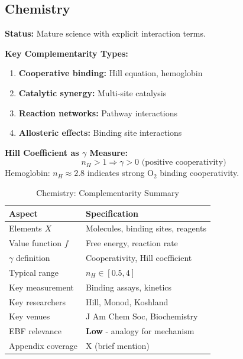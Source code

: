 \subsection{Chemistry}
\label{sec:chem}

\begin{tcolorbox}[colback=yellow!5!white,colframe=yellow!75!black,title=\textbf{Chemistry: Molecular Interactions and Catalysis}]

\textbf{Status:} Mature science with explicit interaction terms.

\textbf{Key Complementarity Types:}
\begin{enumerate}[noitemsep]
    \item \textbf{Cooperative binding:} Hill equation, hemoglobin
    \item \textbf{Catalytic synergy:} Multi-site catalysis
    \item \textbf{Reaction networks:} Pathway interactions
    \item \textbf{Allosteric effects:} Binding site interactions
\end{enumerate}

\textbf{Hill Coefficient as $\gamma$ Measure:}
\begin{equation}
n_H > 1 \Rightarrow \gamma > 0 \text{ (positive cooperativity)}
\end{equation}
Hemoglobin: $n_H \approx 2.8$ indicates strong O$_2$ binding cooperativity.

\end{tcolorbox}

\begin{table}[h]
\centering
\caption{Chemistry: Complementarity Summary}
\label{tab:chem-summary}
\renewcommand{\arraystretch}{1.3}
\small
\begin{tabular}{@{}ll@{}}
\toprule
\textbf{Aspect} & \textbf{Specification} \\
\midrule
Elements $X$ & Molecules, binding sites, reagents \\
Value function $f$ & Free energy, reaction rate \\
$\gamma$ definition & Cooperativity, Hill coefficient \\
Typical range & $n_H \in [0.5, 4]$ \\
Key measurement & Binding assays, kinetics \\
Key researchers & Hill, Monod, Koshland \\
Key venues & J Am Chem Soc, Biochemistry \\
EBF relevance & \textbf{Low} - analogy for mechanism \\
Appendix coverage & X (brief mention) \\
\bottomrule
\end{tabular}
\end{table}

